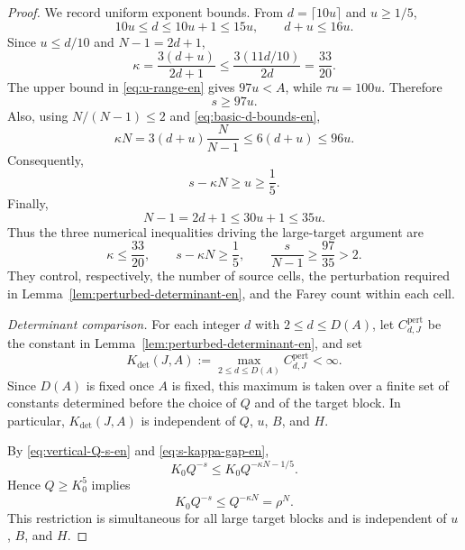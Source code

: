 \documentclass[11pt]{amsart}
\numberwithin{equation}{section}
\theoremstyle{definition}
\theoremstyle{remark}
\begin{document}
\begin{proof}
We record uniform exponent bounds. From $d=\lceil10u\rceil$ and
$u\geq1/5$,
\begin{equation}\label{eq:basic-d-bounds-en}
10u\leq d\leq10u+1\leq15u,
\qquad
d+u\leq16u.
\end{equation}
Since $u\leq d/10$ and $N-1=2d+1$,
\begin{equation}\label{eq:kappa-bound-en}
\kappa
=\frac{3(d+u)}{2d+1}
\leq\frac{3(11d/10)}{2d}
=\frac{33}{20}.
\end{equation}
The upper bound in \eqref{eq:u-range-en} gives $97u<A$, while
$\tau u=100u$. Therefore
\begin{equation}\label{eq:s-lower-en}
s\geq97u.
\end{equation}
Also, using $N/(N-1)\leq2$ and
\eqref{eq:basic-d-bounds-en},
\begin{equation}\label{eq:kappaN-upper-en}
\kappa N
=3(d+u)\frac{N}{N-1}
\leq6(d+u)
\leq96u.
\end{equation}
Consequently,
\begin{equation}\label{eq:s-kappa-gap-en}
s-\kappa N\geq u\geq\frac{1}{5}.
\end{equation}
Finally,
\begin{equation}\label{eq:N-upper-en}
N-1=2d+1\leq30u+1\leq35u.
\end{equation}
Thus the three numerical inequalities driving the large-target
argument are
\[
\kappa\leq\frac{33}{20},\qquad
s-\kappa N\geq\frac15,\qquad
\frac{s}{N-1}\geq\frac{97}{35}>2.
\]
They control, respectively, the number of source cells, the
perturbation required in Lemma~\ref{lem:perturbed-determinant-en},
and the Farey count within each cell.

\emph{Determinant comparison.} For each integer $d$ with $2\leq d\leq D(A)$, let
$C_{d,J}^{\mathrm{pert}}$ be the constant in
Lemma~\ref{lem:perturbed-determinant-en}, and set
\begin{equation}\label{eq:uniform-det-constant-en}
K_{\det}(J,A)
:=
\max_{2\leq d\leq D(A)}C_{d,J}^{\mathrm{pert}}<\infty.
\end{equation}
Since $D(A)$ is fixed once $A$ is fixed, this maximum is taken over
a finite set of constants determined before the choice of $Q$ and of
the target block. In particular, $K_{\det}(J,A)$ is independent of
$Q$, $u$, $B$, and $H$.

By \eqref{eq:vertical-Q-s-en} and
\eqref{eq:s-kappa-gap-en},
\[
K_0Q^{-s}\leq K_0Q^{-\kappa N-1/5}.
\]
Hence $Q\geq K_0^5$ implies
\[
K_0Q^{-s}\leq Q^{-\kappa N}=\rho^N.
\]
This restriction is simultaneous for all large target blocks and is
independent of $u$, $B$, and $H$.


\end{proof}
\end{document}
